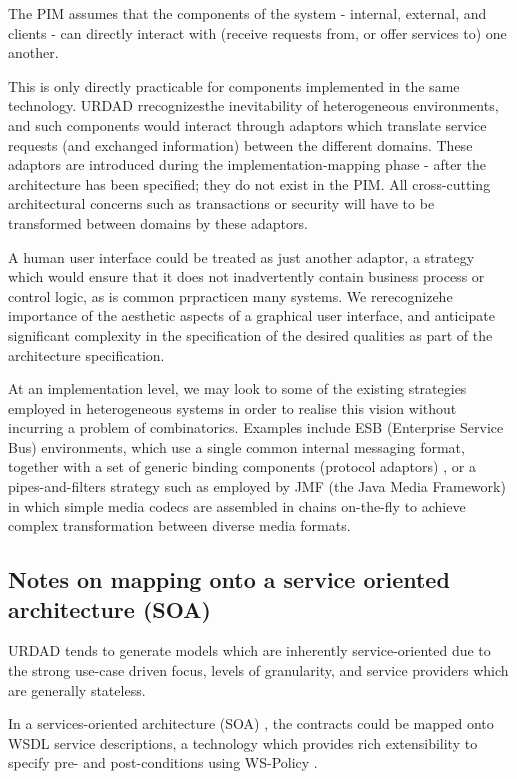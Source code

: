 \documentclass{IOS-Book-Article}
\begin{document}
The PIM assumes that the components of the system - internal, external, and clients -
can directly interact with (receive requests from, or offer services to) one another.

This is only directly practicable for components implemented in the same
technology. URDAD rrecognizesthe inevitability of heterogeneous environments,
and such components would interact through adaptors which translate service requests 
(and exchanged information) between the different domains. These adaptors are
introduced during the implementation-mapping phase - after the architecture has been
specified; they do not exist in the PIM.
All cross-cutting architectural concerns such as transactions or security will
have to be transformed between domains by these adaptors.

A human user interface could be treated as just another adaptor, a strategy
which would ensure that it does not inadvertently contain business process or
control logic, as is common prpracticen many systems. We rerecognizehe importance
of the aesthetic aspects of a graphical user interface, and anticipate significant 
complexity in the specification of the desired qualities as part of the 
architecture specification.

At an implementation level, we may look to some of the existing strategies employed in
heterogeneous systems in order to realise this vision without incurring
a problem of combinatorics. Examples include ESB (Enterprise Service Bus)
environments, which use a single common internal messaging format, together with a set of generic
binding components (protocol adaptors) \cite{tenHove:jbiComponentsTheory}, 
or a pipes-and-filters strategy such as employed by 
JMF (the Java Media Framework) \cite{sun:jmfCodecs} in which simple media codecs 
are assembled in chains on-the-fly to achieve complex transformation between 
diverse media formats.


\subsection{Notes on mapping onto a service oriented architecture (SOA)}

URDAD tends to generate models which are inherently service-oriented
due to the strong use-case driven focus, levels of granularity, and
service providers which are generally stateless.

In a services-oriented architecture (SOA) \cite{erl:soa}, the contracts 
could be mapped onto WSDL service descriptions, a technology
which provides rich extensibility to specify pre- and post-conditions
using WS-Policy \cite{w3c:wsPolicy}.
\end{document}

